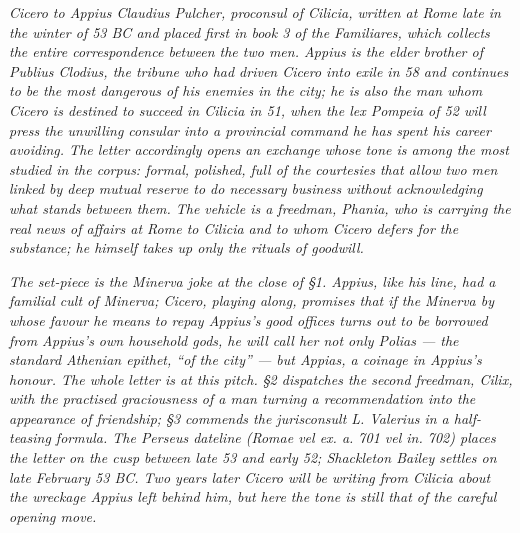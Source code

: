 
\textit{Cicero to Appius Claudius Pulcher, proconsul of Cilicia,
written at Rome late in the winter of 53 BC and placed first
in book 3 of the \textit{Familiares}, which collects the entire
correspondence between the two men. Appius is the elder brother
of Publius Clodius, the tribune who had driven Cicero into
exile in 58 and continues to be the most dangerous of his
enemies in the city; he is also the man whom Cicero is destined
to succeed in Cilicia in 51, when the lex Pompeia of 52 will
press the unwilling consular into a provincial command he has
spent his career avoiding. The letter accordingly opens an
exchange whose tone is among the most studied in the corpus:
formal, polished, full of the courtesies that allow two men
linked by deep mutual reserve to do necessary business without
acknowledging what stands between them. The vehicle is a
freedman, Phania, who is carrying the real news of affairs at
Rome to Cilicia and to whom Cicero defers for the substance; he
himself takes up only the rituals of goodwill.}

\textit{The set-piece is the Minerva joke at the close of \S 1.
Appius, like his line, had a familial cult of Minerva; Cicero,
playing along, promises that if the Minerva by whose favour he
means to repay Appius's good offices turns out to be borrowed
from Appius's own household gods, he will call her not only
\textit{Polias} --- the standard Athenian epithet, ``of the
city'' --- but \textit{Appias}, a coinage in Appius's honour.
The whole letter is at this pitch. \S 2 dispatches the second
freedman, Cilix, with the practised graciousness of a man
turning a recommendation into the appearance of friendship;
\S 3 commends the jurisconsult L. Valerius in a half-teasing
formula. The Perseus dateline (\textit{Romae vel ex. a. 701
\textnumero{} vel in. 702}) places the letter on the cusp
between late 53 and early 52; Shackleton Bailey settles on
late February 53 BC. Two years later Cicero will be writing
from Cilicia about the wreckage Appius left behind him, but
here the tone is still that of the careful opening move.}
